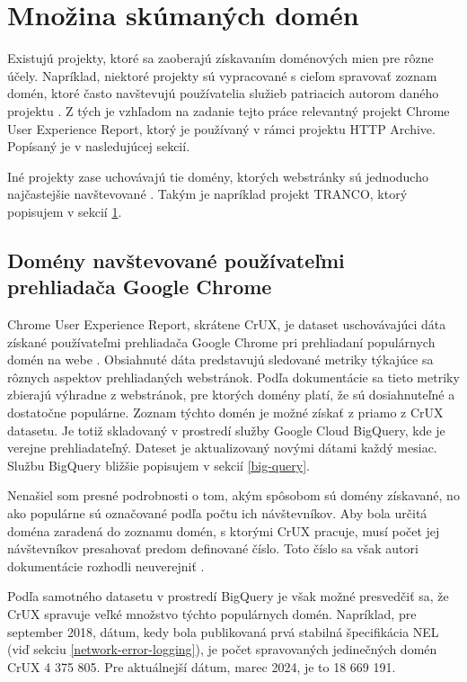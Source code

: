 \pagebreak

\section{Množina skúmaných domén}
\label{tranco}

Existujú projekty, ktoré sa zaoberajú získavaním doménových mien pre rôzne účely.
Napríklad, niektoré projekty sú vypracované s cieľom spravovať zoznam domén, ktoré často navštevujú používatelia služieb patriacich autorom daného projektu \cite{chrome-crux}. 
Z tých je vzhľadom na zadanie tejto práce relevantný projekt Chrome User Experience Report, ktorý je používaný v rámci projektu HTTP Archive. 
Popísaný je v nasledujúcej sekcií.

Iné projekty zase uchovávajú tie domény, ktorých webstránky sú jednoducho najčastejšie navštevované \cite{hacker-target-website-lists-overview, tranco}.
Takým je napríklad projekt TRANCO, ktorý popisujem v sekcií \ref{tranco}.

\subsection{Domény navštevované používateľmi prehliadača Google Chrome}
\label{chrome-user-experience-report}

Chrome User Experience Report, skrátene CrUX, je dataset uschovávajúci dáta získané používateľmi prehliadača Google Chrome pri prehliadaní populárnych domén na webe \cite{chrome-crux}.
Obsiahnuté dáta predstavujú sledované metriky týkajúce sa rôznych aspektov prehliadaných webstránok.
Podľa dokumentácie sa tieto metriky zbierajú výhradne z webstránok, pre ktorých domény platí, že sú dosiahnuteľné a dostatočne populárne.
Zoznam týchto domén je možné získať z priamo z CrUX datasetu.
Je totiž skladovaný v prostredí služby Google Cloud BigQuery, kde je verejne prehliadateľný. 
Dateset je aktualizovaný novými dátami každý mesiac.
Službu BigQuery bližšie popisujem v sekcií \ref{big-query}.

Nenašiel som presné podrobnosti o tom, akým spôsobom sú domény získavané, no ako populárne sú označované podľa počtu ich návštevníkov.
Aby bola určitá doména zaradená do zoznamu domén, s ktorými CrUX pracuje, musí počet jej návštevníkov presahovať predom definované číslo.
Toto číslo sa však autori dokumentácie rozhodli neuverejniť \cite{chrome-crux-methodology}.

Podľa samotného datasetu v prostredí BigQuery je však možné presvedčiť sa, že CrUX spravuje veľké množstvo týchto populárnych domén.
Napríklad, pre september 2018, dátum, kedy bola publikovaná prvá stabilná špecifikácia NEL (viď sekciu \ref{network-error-logging}), je počet spravovaných jedinečných domén CrUX 4 375 805.
Pre aktuálnejší dátum, marec 2024, je to 18 669 191.



